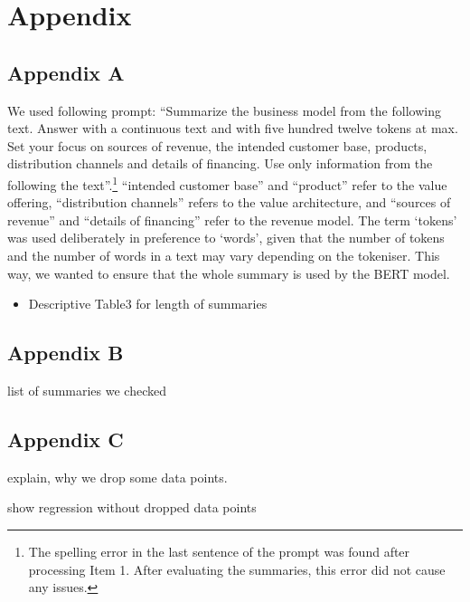 \documentclass[
]{article}
\providecommand{\tightlist}{%
  \setlength{\itemsep}{0pt}\setlength{\parskip}{0pt}}\usepackage{longtable,booktabs,array}
\begin{document}
\newpage{}

\section{Appendix}\label{appendix}

\subsection{Appendix A}\label{appendix-a}

We used following prompt: ``Summarize the business model from the
following text. Answer with a continuous text and with five hundred
twelve tokens at max. Set your focus on sources of revenue, the intended
customer base, products, distribution channels and details of financing.
Use only information from the following the text''.\footnote{The
  spelling error in the last sentence of the prompt was found after
  processing Item 1. After evaluating the summaries, this error did not
  cause any issues.} ``intended customer base'' and ``product'' refer to
the value offering, ``distribution channels'' refers to the value
architecture, and ``sources of revenue'' and ``details of financing''
refer to the revenue model. The term `tokens' was used deliberately in
preference to `words', given that the number of tokens and the number of
words in a text may vary depending on the tokeniser. This way, we wanted
to ensure that the whole summary is used by the BERT model.

\begin{itemize}
\tightlist
\item
  Descriptive Table3 for length of summaries
\end{itemize}

\subsection{Appendix B}\label{appendix-b}

list of summaries we checked

\subsection{Appendix C}\label{appendix-c}

explain, why we drop some data points.

show regression without dropped data points
\end{document}
